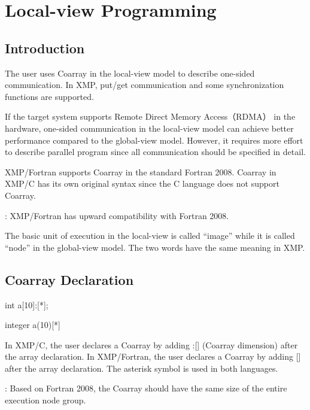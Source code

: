 \section{Local-view Programming}

\subsection{Introduction}

The user uses Coarray in the local-view model to describe one-sided
communication. In XMP, put/get communication and some synchronization
functions are supported.

If the target system supports Remote Direct Memory Access（RDMA） in the
hardware, one-sided communication in the local-view model can achieve
better performance compared to the global-view model. However, it
requires more effort to describe parallel program since all
communication should be specified in detail.

XMP/Fortran supports Coarray in the standard Fortran 2008. Coarray in
XMP/C has its own original syntax since the C language does not support
Coarray.

\noindent\hrulefill

: XMP/Fortran has upward compatibility with Fortran
2008.

\noindent\hrulefill

The basic unit of execution in the local-view is called “image” while it
is called “node” in the global-view model. The two words have the same
meaning in XMP.

\subsection{Coarray Declaration}

\begin{XCexample}
int a[10]:[*];
\end{XCexample}

\begin{XFexample}
integer a(10)[*]
\end{XFexample}

In XMP/C, the user declares a Coarray by adding :[] (Coarray dimension)
after the array declaration. In XMP/Fortran, the user declares a Coarray
by adding [] after the array declaration. The asterisk symbol is used in
both languages.

\noindent\hrulefill

: Based on Fortran 2008, the Coarray should have the
same size of the entire execution node group.

